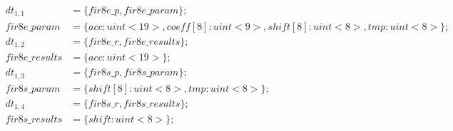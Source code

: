 %
\footnotesize
\begin{align*}
    dt_{1,1} &= \{ fir8e\_p, fir8e\_param \}; \\
    fir8e\_param &= \{ acc: uint<19>, coeff[8]: uint<9>, shift[8]: uint<8>, tmp: uint<8> \};\\
    dt_{1,2} &= \{ fir8e\_r, fir8e\_results \}; \\
    fir8e\_results &= \{ acc: uint<19> \}; \\
    dt_{1,3} &= \{ fir8s\_p, fir8s\_param \}; \\
    fir8s\_param &= \{ shift[8]: uint<8>, tmp: uint<8> \}; \\
    dt_{1,4} &= \{ fir8s\_r, fir8s\_results \}; \\
    fir8s\_results &= \{ shift: uint<8> \}; 
\end{align*}
\normalsize
%
